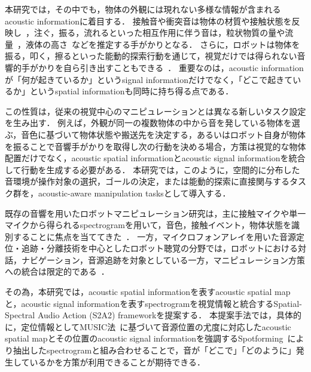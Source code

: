 \documentclass{article}
\begin{document}
本研究では，その中でも，物体の外観には現れない多様な情報が含まれるacoustic informationに着目する．
接触音や衝突音は物体の材質や接触状態を反映し~\citep{eppe2018interactive,jin2019openenv,seehearfeel,thatsoundsright,hearingtouch2024,maniwav,multigen2025}，注ぐ，振る，流れるといった相互作用に伴う音は，粒状物質の量や流量~\citep{clarke2018learning,wilson2019pouring}，液体の高さ~\citep{liang2020audiopouring,du2021robotpouring}などを推定する手がかりとなる．
さらに，ロボットは物体を振る，叩く，擦るといった能動的探索行動を通じて，視覚だけでは得られない音響的手がかりを自ら引き出すこともできる~\citep{eppe2018interactive,caver2025,mosaic2024}．
重要なのは，acoustic informationが「何が起きているか」というsignal informationだけでなく，「どこで起きているか」というspatial informationも同時に持ち得る点である．

この性質は，従来の視覚中心のマニピュレーションとは異なる新しいタスク設定を生み出す．
例えば，外観が同一の複数物体の中から音を発している物体を選ぶ，音色に基づいて物体状態や搬送先を決定する，あるいはロボット自身が物体を振ることで音響手がかりを取得し次の行動を決める場合，方策は視覚的な物体配置だけでなく，acoustic spatial informationとacoustic signal informationを統合して行動を生成する必要がある．
本研究では，このように，空間的に分布した音環境が操作対象の選択，ゴールの決定，または能動的探索に直接関与するタスク群を，acoustic-aware manipulation tasksとして導入する．

既存の音響を用いたロボットマニピュレーション研究は，主に接触マイクや単一マイクから得られるspectrogramを用いて，音色，接触イベント，物体状態を識別することに焦点を当ててきた~\citep{playitbyear,seehearfeel,maniwav,hearingtouch2024,audiovla}．
一方，マイクロフォンアレイを用いた音源定位・追跡・分離技術を中心としたロボット聴覚の分野では，ロボットにおける対話，ナビゲーション，音源追跡を対象としている一方，マニピュレーション方策への統合は限定的である~\citep{valin2004ssl,evers2018aslam,nakadai2010hark,nakadai2020robotaudition,robotaudition_review2025}．

その為，本研究では，acoustic spatial informationを表すacoustic spatial mapと，acoustic signal informationを表すspectrogramを視覚情報と統合するSpatial-Spectral Audio Action (S2A2) frameworkを提案する．
本提案手法では，具体的に，定位情報としてMUSIC法~\citep{schmidt1986music,doa_survey2025}に基づいて音源位置の尤度に対応したacoustic spatial mapとその位置のacoustic signal informationを強調するSpotforming~\citep{spotforming_nmf}により抽出したspectrogramと組み合わせることで，音が「どこで」「どのように」発生しているかを方策が利用できることが期待できる．
\end{document}
